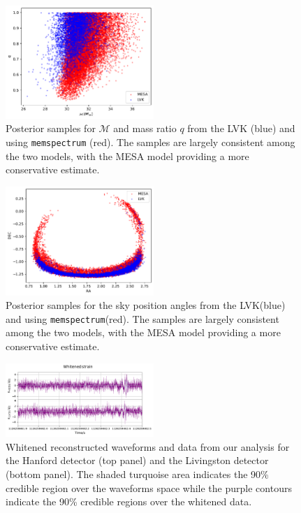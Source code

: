 \documentclass{aa}
\begin{document}
\begin{figure}
	\caption{Posterior samples for $\mathcal{M}$ and mass ratio $q$ from the LVK (blue) and using \texttt{memspectrum} (red). The samples are largely consistent among the two models, with the MESA model providing a more conservative estimate.}
	\label{fig:gw150914_masses}
	\includegraphics[width=0.5\textwidth,keepaspectratio]{Images/gw150914/masses.pdf}
\end{figure}
\begin{figure}
	\caption{Posterior samples for the sky position angles from the LVK(blue) and using \texttt{memspectrum}(red). The samples are largely consistent among the two models, with the MESA model providing a more conservative estimate.}
	\label{fig:gw150914_sky}
	\includegraphics[width=0.5\textwidth,keepaspectratio]{Images/gw150914/sky_position.pdf}
\end{figure}
\begin{figure}
	\caption{Whitened reconstructed waveforms and data from our analysis for the Hanford detector (top panel) and the Livingston detector (bottom panel). The shaded turquoise area indicates the 90\% credible region over the waveforms space while the purple contours indicate the 90\% credible regions over the whitened data.}
	\label{fig:gw150914_waveforms}
	\includegraphics[width=0.5\textwidth,keepaspectratio]{Images/gw150914/waveforms.pdf}
\end{figure}
\end{document}
